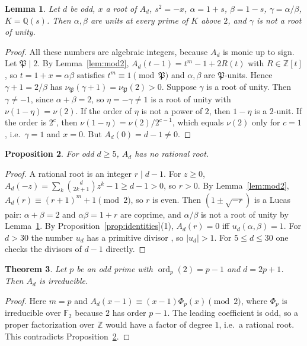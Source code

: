 \documentclass[11pt]{amsart}
\newtheorem{theorem}{Theorem}[section]\newtheorem{proposition}[theorem]{Proposition}\newtheorem{lemma}[theorem]{Lemma}
\theoremstyle{definition}\newtheorem{definition}[theorem]{Definition}\newtheorem{example}[theorem]{Example}
\theoremstyle{remark}\newtheorem{remark}[theorem]{Remark}
\newcommand{\Q}{\mathbb Q}\newcommand{\Z}{\mathbb Z}\newcommand{\F}{\mathbb F}
\begin{document}
\begin{lemma}\label{lem:units}
Let $d$ be odd, $x$ a root of $A_d$, $s^2=-x$, $\alpha=1+s$, $\beta=1-s$, $\gamma=\alpha/\beta$, $K=\Q(s)$. Then $\alpha,\beta$ are units at every
prime of $K$ above $2$, and $\gamma$ is not a root of unity.
\end{lemma}
\begin{proof}
All these numbers are algebraic integers, because $A_d$ is monic up to sign. Let $\mathfrak P\mid2$. By Lemma~\ref{lem:mod2},
$A_d(t-1)=t^m-1+2R(t)$ with $R\in\Z[t]$, so $t=1+x=\alpha\beta$ satisfies $t^m\equiv1\pmod{\mathfrak P}$ and $\alpha,\beta$ are $\mathfrak P$-units.
Hence $\gamma+1=2/\beta$ has $\nu_{\mathfrak P}(\gamma+1)=\nu_{\mathfrak P}(2)>0$. Suppose $\gamma$ is a root of unity. Then $\gamma\ne-1$, since
$\alpha+\beta=2$, so $\eta=-\gamma\ne1$ is a root of unity with $\nu(1-\eta)=\nu(2)$. If the order of $\eta$ is not a power of $2$, then $1-\eta$
is a $2$-unit. If the order is $2^c$, then $\nu(1-\eta)=\nu(2)/2^{c-1}$, which equals $\nu(2)$ only for $c=1$, i.e.\ $\gamma=1$ and $x=0$. But
$A_d(0)=d-1\ne0$.
\end{proof}

\begin{proposition}\label{prop:norational}
For odd $d\ge5$, $A_d$ has no rational root.
\end{proposition}
\begin{proof}
A rational root is an integer $r\mid d-1$. For $z\ge0$, $A_d(-z)=\sum_k\binom d{2k+1}z^k-1\ge d-1>0$, so $r>0$. By Lemma~\ref{lem:mod2},
$A_d(r)\equiv(r+1)^m+1\pmod2$, so $r$ is even. Then $(1\pm\sqrt{-r})$ is a Lucas pair: $\alpha+\beta=2$ and $\alpha\beta=1+r$ are coprime, and
$\alpha/\beta$ is not a root of unity by Lemma~\ref{lem:units}. By Proposition~\ref{prop:identities}(1), $A_d(r)=0$ iff $u_d(\alpha,\beta)=1$. For
$d>30$ the number $u_d$ has a primitive divisor \cite[Thm~1.4]{BHV}, so $|u_d|>1$. For $5\le d\le30$ one checks the divisors of $d-1$ directly.
\end{proof}

\begin{theorem}\label{thm:2p1}
Let $p$ be an odd prime with $\operatorname{ord}_p(2)=p-1$ and $d=2p+1$. Then $A_d$ is irreducible.
\end{theorem}
\begin{proof}
Here $m=p$ and $A_d(x-1)\equiv(x-1)\Phi_p(x)\pmod2$, where $\Phi_p$ is irreducible over $\F_2$ because $2$ has order $p-1$. The leading
coefficient is odd, so a proper factorization over $\Z$ would have a factor of degree $1$, i.e.\ a rational root. This contradicts
Proposition~\ref{prop:norational}.
\end{proof}
\end{document}
